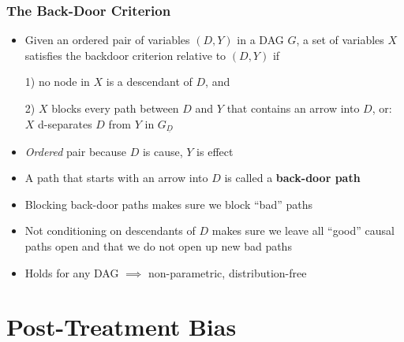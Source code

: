 \documentclass{beamer}
\begin{document}
\begin{frame}[t]
\frametitle{The Back-Door Criterion}

\begin{itemize}
\item<1-> Given an ordered pair of variables $(D, Y)$ in a DAG $G$, a set of variables $X$ satisfies the backdoor criterion relative to $(D, Y)$ if 
\begin{center}
1) no node in $X$ is a descendant of $D$, and 

2) $X$ blocks every path between $D$ and $Y$ that contains an arrow into $D$, or: $X$ d-separates $D$ from $Y$ in $G_{\underline{D}}$ 
\end{center}
\vspace{1cm} 
\item<2-> \textit{Ordered} pair because $D$ is cause, $Y$ is effect 
\item<3-> A path that starts with an arrow into $D$ is called a \textbf{back-door path}
\item<4-> Blocking back-door paths makes sure we block ``bad'' paths
\item<5-> Not conditioning on descendants of $D$ makes sure we leave all ``good'' causal paths open and that we do not open up new bad paths
\item<6-> Holds for any DAG $\implies$ non-parametric, distribution-free 
\end{itemize}
\end{frame}

\section{Post-Treatment Bias}

\begin{frame}[t]
\sectionpage
\end{frame}
\end{document}
